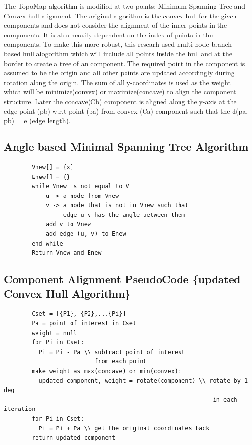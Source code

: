 \documentclass[a4paper]{article}
\begin{document}
    The TopoMap\cite{topomap} algorithm is modified at two points: Minimum Spanning Tree and Convex hull alignment. The original algorithm is the convex hull for the given components and does not consider the alignment of the inner points in the components. It is also heavily dependent on the index of points in the components. To make this more robust, this researh used multi-node branch based hull alogorithm which will include all points inside the hull and at the border to create a tree of an component. The required point in the component is assumed to be the origin and all other points are updated accordingly during rotation along the origin. The sum of all y-coordinates is used as the weight which will be minimize(convex) or maximize(concave) to align the component structure. Later the concave(Cb) component is aligned along the y-axis at the edge point (pb) w.r.t point (pa) from convex (Ca) component such that the d(pa, pb) = e (edge length).

    \newpage
    \subsection{Angle based Minimal Spanning Tree Algorithm}
      \begin{lstlisting}
        Vnew[] = {x}                   
        Enew[] = {}
        while Vnew is not equal to V
            u -> a node from Vnew
            v -> a node that is not in Vnew such that
                 edge u-v has the angle between them
            add v to Vnew
            add edge (u, v) to Enew
        end while
        Return Vnew and Enew
      \end{lstlisting}

      \subsection{Component Alignment PseudoCode \{updated Convex Hull Algorithm\}}
      \begin{lstlisting}
        Cset = [{P1}, {P2},...{Pi}]
        Pa = point of interest in Cset
        weight = null
        for Pi in Cset:
          Pi = Pi - Pa \\ subtract point of interest    
                          from each point
        make weight as max(concave) or min(convex):
          updated_component, weight = rotate(component) \\ rotate by 1 deg
                                                            in each iteration
        for Pi in Cset:
          Pi = Pi + Pa \\ get the original coordinates back
        return updated_component
      \end{lstlisting}
      
\end{document}
